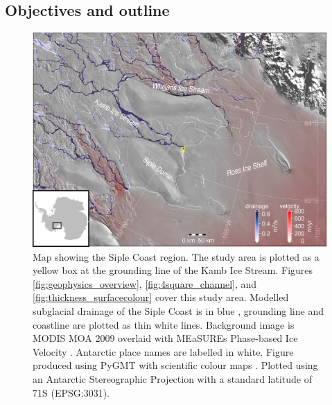 \subsection{Objectives and outline}

\begin{figure}[!ht]
\centering
\includegraphics[width=1\textwidth]{chapters/2/fieldwork_location_small.png}
\caption[Fieldwork location]{Map showing the Siple Coast region. The study area is plotted as a yellow box at the grounding line of the Kamb Ice Stream. Figures \ref{fig:geophysics_overview}, \ref{fig:4square_channel}, and \ref{fig:thickness_surfacecolour} cover this study area. Modelled subglacial drainage of the Siple Coast is in blue \citep{le2009subglacial}, grounding line and coastline \citep{depoorter2013calving} are plotted as thin white lines. Background image is MODIS MOA 2009 \citep{haran2014modis} overlaid with MEaSUREs Phase-based Ice Velocity \citep{mouginot2019continent}. Antarctic place names are labelled in white. Figure produced using PyGMT \citep{uieda2021pygmt,wessel2019generic} with scientific colour maps \citep{crameri2018scientific}. Plotted using an Antarctic Stereographic Projection with a standard latitude of 71\textdegree S (EPSG:3031).}
\label{fig:fieldwork_location}
\end{figure} 


